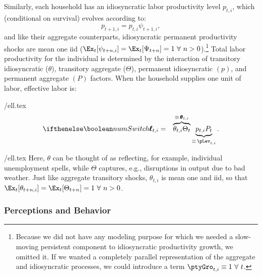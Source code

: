 \documentclass[titlepage]{\econtex}\newcommand{\texname}{cAndCwithStickyE}
\begin{document}
Similarly, each household has an idiosyncratic labor productivity level $p_{t,i}$, which (conditional on survival) evolves according to:
\begin{equation}
p_{t+1,i} = p_{t,i} \psi_{t+1,i},  \label{eq:IndRandWalk}
\end{equation}
and like their aggregate counterparts, idiosyncratic permanent productivity shocks are mean
one iid ($\Ex_{t}[\psi_{t+n,i}]=\Ex_{t}[\Psi_{t+n}]= 1~\forall ~n>0$).\footnote{Because we did not have any modeling purpose for which we needed a slow-moving persistent component to idiosyncratic productivity growth, we omitted it.  If we wanted a completely parallel representation of the aggregate and idiosyncratic processes, we could introduce a term $\ptyGro_{t,i} \equiv 1 ~\forall~t$.}
Total labor productivity for the individual is determined by the interaction of transitory idiosyncratic
($\theta$), transitory aggregate ($\Theta$), permanent idiosyncratic $({p})$, and permanent aggregate
$({P})$ factors.  When the household supplies one unit of labor, effective labor is:
\begin{verbatimwrite}{\eq/ell.tex}
\newcommand{\TranShocktpOne }{\Theta_{t}}
\begin{eqnarray}
  \label{eq:ell}
\ifnumSw  \pmb{\ell}_{t,i} & = & \overbrace{\theta_{t,i}\TranShocktpOne}^{\equiv\,\pmb{\theta}_{t,i}}\underbrace{{p}_{t,i} {P}_{t}}_{\equiv\,\pLev_{t,i}}.
\end{eqnarray}
\end{verbatimwrite}
 {\eq/ell.tex} Here, $\theta$ can be thought of as reflecting, for example, individual unemployment spells, while $\Theta$ captures, e.g., disruptions in output due to bad weather.  Just like aggregate transitory shocks, $\theta_{t,i}$ is mean one and iid, so that $\Ex_{t}[\theta_{t+n,i}]=\Ex_{t}[\Theta_{t+n}]=1~\forall~n>0$.  

\subsubsection{Perceptions and Behavior}
\end{document}
